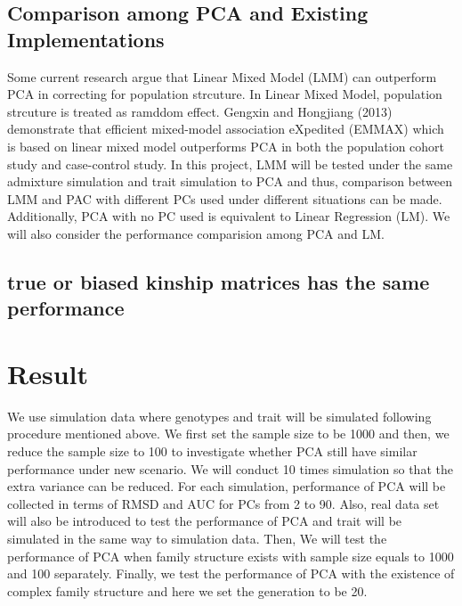 \documentclass[12pt]{article}
\begin{document}
\subsection{Comparison among PCA and Existing Implementations }
Some current research argue that Linear Mixed Model (LMM) can outperform PCA in correcting for population strcuture. In Linear Mixed Model, population strcuture is treated as ramddom effect. Gengxin and Hongjiang (2013) demonstrate that efficient
mixed-model association eXpedited (EMMAX) which is based on linear mixed model outperforms PCA in both the population cohort study and case-control study. In this project, LMM will be tested under the same admixture simulation and trait simulation to PCA and thus, comparison between LMM and PAC with different PCs used under different situations can be made. Additionally, PCA with no PC used is equivalent to Linear Regression (LM). We will also consider the performance comparision among PCA and LM. 

\subsection{true or biased kinship matrices has the same performance}



\section{Result}

We use simulation data where genotypes and trait will be simulated following procedure mentioned above. We first set the sample size to be 1000 and then, we reduce the sample size to 100 to investigate whether PCA still have similar performance under new scenario. We will conduct 10 times simulation so that the extra variance can be reduced. For each simulation, performance of PCA will be collected in terms of RMSD and AUC for PCs from 2 to 90. Also, real data set will also be introduced to test the performance of PCA and trait will be simulated in the same way to simulation data. Then, We will test the performance of PCA when family structure exists with sample size equals to 1000 and 100 separately. Finally, we test the performance of PCA with the existence of complex family structure and here we set the generation to be 20.
\end{document}
